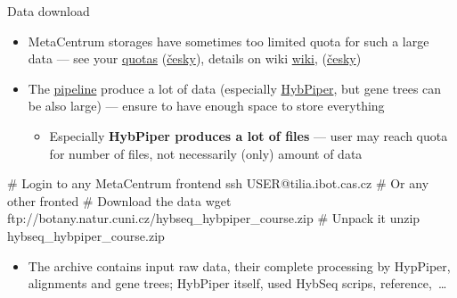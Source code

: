 \documentclass[compress, ucs, xelatex, 11pt, xcolor=x11names, aspectratio=169,
	hyperref={
		bookmarks=true,
		unicode=true,
		colorlinks=true,
		pdftitle={HybSeq course},
		plainpages=false,
		pdfauthor={Vojtech Zeisek},
		pdfsubject={Practical processing of HybSeq target enrichment sequencing data on computing grids like MetaCentrum},
		pdfcreator={XeLaTeX},
		pdfkeywords={BASH, command line, GNU, HybSeq, Linux, MetaCentrum, sequencing shell, target enrichment},
		linkcolor=Turquoise4, %
		anchorcolor=DodgerBlue4, %
		citecolor=DodgerBlue4, %
		filecolor=DodgerBlue4, %
		menucolor=Tan4, %
		urlcolor=DarkOliveGreen4, %
		pdftex},
	url={hyphens, lowtilde} %
	]{beamer}
\renewcommand{\alert}[1]{\textcolor{OrangeRed3}{#1}}
\begin{document}
\begin{frame}[fragile]{Data download}
	\label{datadownload}
	\begin{itemize}
		\item MetaCentrum storages have sometimes too limited quota for such a large data --- see your \href{https://metavo.metacentrum.cz/en/myaccount/kvoty}{quotas} (\href{http://metavo.metacentrum.cz/cs/myaccount/kvoty}{česky}), details on wiki \href{https://wiki.metacentrum.cz/wiki/Quotas}{wiki}, (\href{https://wiki.metacentrum.cz/wiki/Kvoty}{česky})
		\item The \href{https://github.com/V-Z/hybseq-scripts}{pipeline} produce a lot of data (especially \href{https://github.com/mossmatters/HybPiper/}{HybPiper}, but gene trees can be also large) --- ensure to have enough space to store everything
		\begin{itemize}
			\item Especially \textbf{HybPiper produces a lot of files} --- \alert{user may reach quota for number of files}, not necessarily (only) amount of data
		\end{itemize}
	\end{itemize}
	\begin{bashcode}
    # Login to any MetaCentrum frontend
    ssh USER@tilia.ibot.cas.cz # Or any other fronted
    # Download the data
    wget ftp://botany.natur.cuni.cz/hybseq_hybpiper_course.zip
    # Unpack it
    unzip hybseq_hybpiper_course.zip
	\end{bashcode}
	\begin{itemize}
		 \item The archive contains input raw data, their complete processing by HypPiper, alignments and gene trees; HybPiper itself, used HybSeq scrips, reference,~\ldots
	\end{itemize}
\end{frame}
\end{document}
